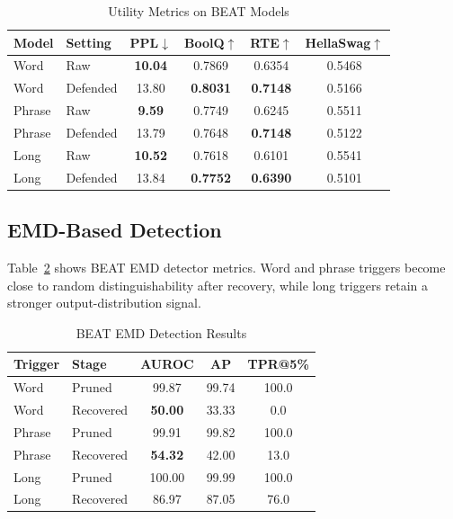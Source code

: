 \documentclass[lettersize,journal]{IEEEtran}
\begin{document}
\begin{table}[!t]
\caption{Utility Metrics on BEAT Models}
\label{tab:utility}
\centering
\begin{tabular}{llcccc}
\toprule
Model & Setting & PPL$\downarrow$ & BoolQ$\uparrow$ & RTE$\uparrow$ & HellaSwag$\uparrow$ \\
\midrule
Word & Raw & \textbf{10.04} & 0.7869 & 0.6354 & 0.5468 \\
Word & Defended & 13.80 & \textbf{0.8031} & \textbf{0.7148} & 0.5166 \\
Phrase & Raw & \textbf{9.59} & 0.7749 & 0.6245 & 0.5511 \\
Phrase & Defended & 13.79 & 0.7648 & \textbf{0.7148} & 0.5122 \\
Long & Raw & \textbf{10.52} & 0.7618 & 0.6101 & 0.5541 \\
Long & Defended & 13.84 & \textbf{0.7752} & \textbf{0.6390} & 0.5101 \\
\bottomrule
\end{tabular}
\end{table}

\subsection{EMD-Based Detection}
Table~\ref{tab:emd} shows BEAT EMD detector metrics. Word and phrase triggers become close to random distinguishability after recovery, while long triggers retain a stronger output-distribution signal.

\begin{table}[!t]
\caption{BEAT EMD Detection Results}
\label{tab:emd}
\centering
\begin{tabular}{llccc}
\toprule
Trigger & Stage & AUROC & AP & TPR@5\% \\
\midrule
Word & Pruned & 99.87 & 99.74 & 100.0 \\
Word & Recovered & \textbf{50.00} & 33.33 & 0.0 \\
Phrase & Pruned & 99.91 & 99.82 & 100.0 \\
Phrase & Recovered & \textbf{54.32} & 42.00 & 13.0 \\
Long & Pruned & 100.00 & 99.99 & 100.0 \\
Long & Recovered & 86.97 & 87.05 & 76.0 \\
\bottomrule
\end{tabular}
\end{table}
\end{document}
